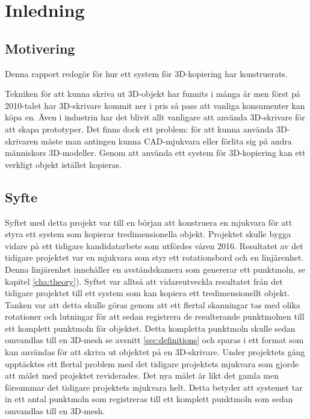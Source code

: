 \chapter{Inledning}
\label{cha:introduction}

\section{Motivering}
\label{sec:motivation}

Denna rapport redogör för hur ett system för 3D-kopiering har konstruerats. 

Tekniken för att kunna skriva ut 3D-objekt har funnits i många år men först på 2010-talet har 3D-skrivare kommit ner i pris så pass att vanliga konsumenter kan köpa en. Även i industrin har det blivit allt vanligare att använda 3D-skrivare för att skapa prototyper. Det finns dock ett problem: för att kunna använda 3D-skrivaren måste man antingen kunna CAD-mjukvara eller förlita sig på andra människors 3D-modeller. Genom att använda ett system för 3D-kopiering kan ett verkligt objekt istället kopieras.


\section{Syfte}
\label{sec:aim}

Syftet med detta projekt var till en början att konstruera en mjukvara för att styra ett system som kopierar tredimensionella objekt. Projektet skulle bygga vidare på ett tidigare kandidatarbete som utfördes våren 2016. Resultatet av det tidigare projektet var en mjukvara som styr ett rotationsbord och en linjärenhet. Denna linjärenhet innehåller en avståndskamera som genererar ett punktmoln, se kapitel \ref{cha:theory}). Syftet var alltså att vidareutveckla resultatet från det tidigare projektet till ett system som kan kopiera ett tredimensionellt objekt. Tanken var att detta skulle göras genom att ett flertal skanningar tas med olika rotationer och lutningar för att sedan registrera de resulterande punktmolnen till ett komplett punktmoln för objektet. Detta kompletta punktmoln skulle sedan omvandlas till en 3D-mesh se avsnitt \ref{sec:definitions} och sparas i ett format som kan användas för att skriva ut objektet på en 3D-skrivare.  Under projektets gång upptäcktes ett flertal problem med det tidigare projektets mjukvara som gjorde att målet med projektet reviderades. Det nya målet är likt det gamla men försummar det tidigare projektets mjukvara helt. Detta betyder att systemet tar in ett antal punktmoln som registreras till ett komplett punktmoln som sedan omvandlas till en 3D-mesh.


